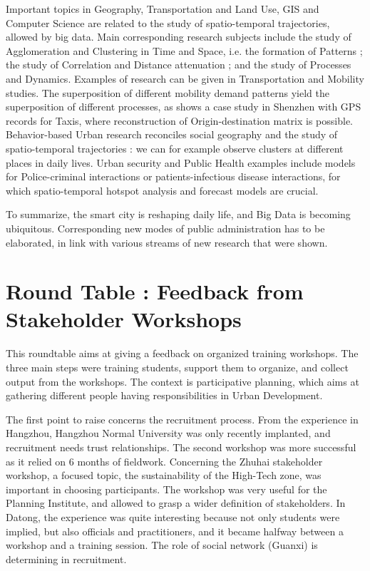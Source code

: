 \documentclass[10pt]{article}
\begin{document}
Important topics in Geography, Transportation and Land Use, GIS and Computer Science are related to the study of spatio-temporal trajectories, allowed by big data. Main corresponding research subjects include the study of Agglomeration and Clustering in Time and Space, i.e. the formation of Patterns ; the study of Correlation and Distance attenuation ; and the study of Processes and Dynamics. Examples of research can be given in Transportation and Mobility studies. The superposition of different mobility demand patterns yield the superposition of different processes, as shows a case study in Shenzhen with GPS records for Taxis, where reconstruction of Origin-destination matrix is possible. Behavior-based Urban research reconciles social geography and the study of spatio-temporal trajectories : we can for example observe clusters at different places in daily lives. Urban security and Public Health examples include models for Police-criminal interactions or patients-infectious disease interactions, for which spatio-temporal hotspot analysis and forecast models are crucial.

To summarize, the smart city is reshaping daily life, and Big Data is becoming ubiquitous. Corresponding new modes of public administration has to be elaborated, in link with various streams of new research that were shown.




\section*{Round Table : Feedback from Stakeholder Workshops}


This roundtable aims at giving a feedback on organized training workshops. The three main steps were training students, support them to organize, and collect output from the workshops. The context is participative planning, which aims at gathering different people having responsibilities in Urban Development.

The first point to raise concerns the recruitment process. From the experience in Hangzhou, Hangzhou Normal University was only recently implanted, and recruitment needs trust relationships. The second workshop was more successful as it relied on 6 months of fieldwork. Concerning the Zhuhai stakeholder workshop, a focused topic, the sustainability of the High-Tech zone, was important in choosing participants. The workshop was very useful for the Planning Institute, and allowed to grasp a wider definition of stakeholders. In Datong, the experience was quite interesting because not only students were implied, but also officials and practitioners, and it became halfway between a workshop and a training session. The role of social network (Guanxi) is determining in recruitment.
\end{document}
